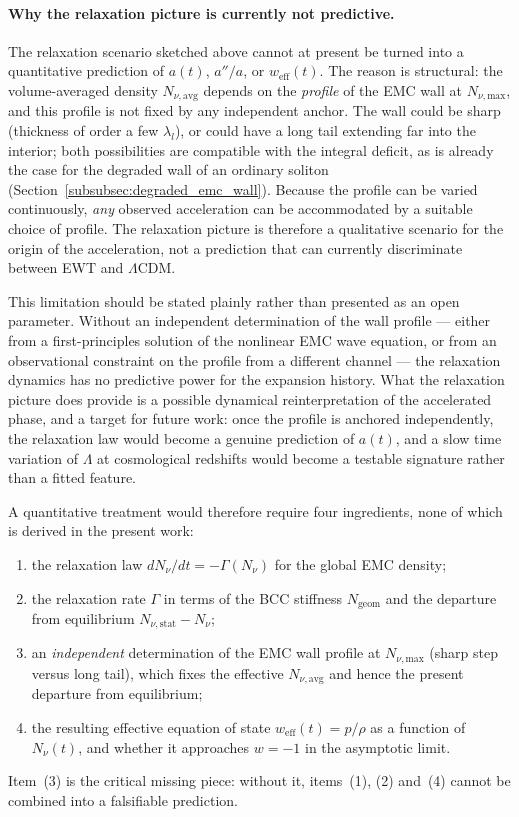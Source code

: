 \documentclass[10pt,a4paper]{article}
\begin{document}
\paragraph{Why the relaxation picture is currently not predictive.}
The relaxation scenario sketched above cannot at present be turned
into a quantitative prediction of \(a(t)\), \(a''/a\), or
\(w_{\text{eff}}(t)\). The reason is structural: the volume-averaged
density \(N_{\nu,\text{avg}}\) depends on the \emph{profile} of the
EMC wall at \(N_{\nu,\text{max}}\), and this profile is not fixed by
any independent anchor. The wall could be sharp (thickness of order
a few \(\lambda_l\)), or could have a long tail extending far into
the interior; both possibilities are compatible with the integral
deficit, as is already the case for the degraded wall of an ordinary
soliton (Section~\ref{subsubsec:degraded_emc_wall}). Because the
profile can be varied continuously, \emph{any} observed acceleration
can be accommodated by a suitable choice of profile. The relaxation
picture is therefore a qualitative scenario for the origin of the
acceleration, not a prediction that can currently discriminate
between EWT and \(\Lambda\)CDM.

This limitation should be stated plainly rather than presented as an
open parameter. Without an independent determination of the wall
profile --- either from a first-principles solution of the nonlinear
EMC wave equation, or from an observational constraint on the
profile from a different channel --- the relaxation dynamics has no
predictive power for the expansion history. What the relaxation
picture does provide is a possible dynamical reinterpretation of the
accelerated phase, and a target for future work: once the profile is
anchored independently, the relaxation law would become a genuine
prediction of \(a(t)\), and a slow time variation of \(\Lambda\) at
cosmological redshifts would become a testable signature rather than
a fitted feature.

A quantitative treatment would therefore require four ingredients,
none of which is derived in the present work:
\begin{enumerate}
	\item the relaxation law \(dN_\nu/dt = -\Gamma(N_\nu)\) for the
	global EMC density;
	\item the relaxation rate \(\Gamma\) in terms of the BCC
	stiffness \(N_{\text{geom}}\) and the departure from
	equilibrium \(N_{\nu,\text{stat}} - N_\nu\);
	\item an \emph{independent} determination of the EMC wall
	profile at \(N_{\nu,\text{max}}\) (sharp step versus long tail),
	which fixes the effective \(N_{\nu,\text{avg}}\) and hence the
	present departure from equilibrium;
	\item the resulting effective equation of state
	\(w_{\text{eff}}(t) = p/\rho\) as a function of \(N_\nu(t)\),
	and whether it approaches \(w = -1\) in the asymptotic limit.
\end{enumerate}
Item~(3) is the critical missing piece: without it, items~(1),
(2) and~(4) cannot be combined into a falsifiable prediction.
\end{document}
